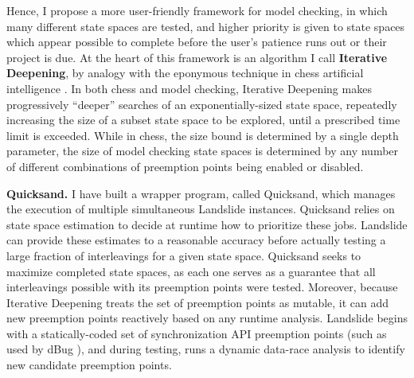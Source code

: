 Hence, I propose a more user-friendly framework for model checking, in which many different state spaces are tested,
and higher priority is given to state spaces which appear possible to complete before the user's patience runs out or their project is due.
At the heart of this framework is an algorithm I call {\bf Iterative Deepening},
by analogy with the eponymous technique in chess artificial intelligence \cite{iterative-deepening-chess-ai}.
In both chess and model checking, Iterative Deepening makes progressively ``deeper'' searches of an exponentially-sized state space,
repeatedly increasing the size of a subset state space to be explored,
until a prescribed time limit is exceeded.
While in chess, the size bound is determined by a single depth parameter,
the size of model checking state spaces is determined by any number of different combinations of preemption points being enabled or disabled.

{\bf Quicksand.}
I have built a wrapper program, called Quicksand, which manages the execution of multiple simultaneous Landslide instances.
Quicksand relies on state space estimation \cite{estimation} to decide at runtime how to prioritize these jobs.
Landslide can provide these estimates to a reasonable accuracy before actually testing a large fraction of interleavings for a given state space.
Quicksand seeks to maximize completed state spaces,
as each one serves as a guarantee that all interleavings possible with its preemption points were tested.
Moreover, because Iterative Deepening treats the set of preemption points as mutable,
it can add new preemption points reactively based on any runtime analysis.
Landslide begins with a statically-coded set of synchronization API preemption points (such as used by dBug \cite{dbug-ssv}),
and during testing, runs a dynamic data-race analysis \cite{hybriddatarace,tsan,ifrit} to identify new candidate preemption points.

\newcommand\PendingJobs{\ensuremath{\mathcal{P}}}
\newcommand\SuspendedJobs{\ensuremath{\mathcal{S}}}
\newcommand\GetETA[1]{ETA(#1)}
\newcommand\GetPPSet[1]{PPSet(#1)}

